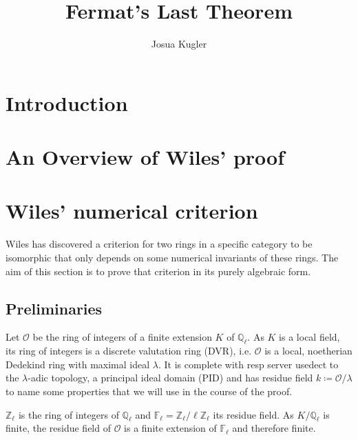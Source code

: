 \documentclass{article}
\title{Fermat's Last Theorem}
\author{Josua Kugler}
\theoremstyle{plain}%
\theoremstyle{definition}
\theoremstyle{remark}
\begin{document}
    \maketitle
    \tableofcontents
    \section{Introduction}
    \section{An Overview of Wiles' proof}
    \newpage
    \section{Wiles' numerical criterion}
    Wiles has discovered a criterion for two rings in a specific category to be isomorphic that only depends on some numerical invariants
    of these rings. The aim of this section is to prove that criterion in its purely algebraic form. 
    
    \subsection{Preliminaries}
    Let \(\mathcal{O}\) be the ring of integers of a finite extension \(K\) of \(\mathbb Q_\ell\). 
    As \(K\) is a local field, its ring of integers is a discrete valutation ring (DVR), i.e. 
    \(\mathcal O\) is a local, noetherian Dedekind ring with maximal ideal \(\lambda\). 
    It is complete with resp server usedect to the \(\lambda\)-adic topology, a principal ideal domain (PID) 
    and has residue field \(k \coloneqq \mathcal{O}/\lambda\)  to name some properties that we will use in the course of the proof.
    
    \(\mathbb Z_\ell\) is the ring of integers of \(\mathbb Q_\ell\) and \(\mathbb F_\ell = \mathbb Z_\ell/\ell \mathbb Z_\ell\) its residue field. 
    As \(K/\mathbb{Q}_\ell\) is finite, the residue field of \(\mathcal{O}\) is a finite extension of $\mathbb F_\ell$ and therefore finite. 
\end{document}
